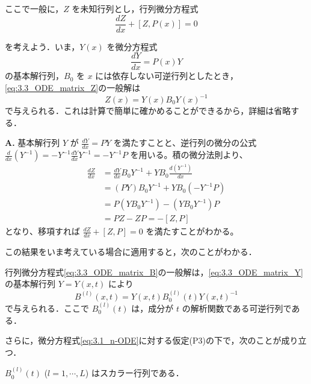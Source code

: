 ここで一般に，$Z$ を未知行列とし，行列微分方程式
\begin{equation}\label{eq:3.3_ODE_matrix_Z}
  \frac{dZ}{dx} + [Z, P(x)] = 0
\end{equation}

を考えよう．いま，$Y(x)$ を微分方程式
\begin{equation}\label{eq:3.3_ODE_matrix_Y}
  \frac{dY}{dx} = P(x)Y
\end{equation}
の基本解行列，$B_0$ を $x$ には依存しない可逆行列としたとき，\eqref{eq:3.3_ODE_matrix_Z}の一般解は
\[
  Z(x) = Y(x)B_0 Y(x)^{-1}
\]
で与えられる．これは計算で簡単に確かめることができるから，詳細は省略する．

\begin{Q}[「詳細は省略する」とあるが、一般解 $Z(x) = Y(x)B_0 Y(x)^{-1}$ が行列微分方程式 $\frac{dZ}{dx} + {[}Z, P{]} = 0$ を満たすことは、具体的にどう計算すれば確かめられるか？]
\textbf{A.} 基本解行列 $Y$ が $\frac{dY}{dx} = PY$ を満たすことと、逆行列の微分の公式 $\frac{d}{dx}(Y^{-1}) = -Y^{-1}\frac{dY}{dx}Y^{-1} = -Y^{-1}P$ を用いる。積の微分法則より、
\begin{align*}
  \frac{dZ}{dx} &= \frac{dY}{dx}B_0 Y^{-1} + Y B_0 \frac{d(Y^{-1})}{dx} \\[2mm]
  &= (PY)B_0 Y^{-1} + Y B_0 (-Y^{-1}P) \\[2mm]
  &= P(Y B_0 Y^{-1}) - (Y B_0 Y^{-1})P \\[2mm]
  &= PZ - ZP = -[Z, P]
\end{align*}
となり、移項すれば $\frac{dZ}{dx} + [Z, P] = 0$ を満たすことがわかる。
\end{Q}

この結果をいま考えている場合に適用すると，次のことがわかる．

\begin{lemma}\label{lem:3.3_solution_ODE}
行列微分方程式\eqref{eq:3.3_ODE_matrix_B}の一般解は，\eqref{eq:3.3_ODE_matrix_Y}の基本解行列 $Y=Y(x,t)$ により
\[
  B^{(l)}(x,t) = Y(x,t)B_0^{(l)}(t)Y(x,t)^{-1}
\]
で与えられる．ここで $B_0^{(l)}(t)$ は，成分が $t$ の解析関数である可逆行列である．
\end{lemma}

さらに，微分方程式\eqref{eq:3.1_n-ODE}に対する仮定(P3)の下で，次のことが成り立つ．

\begin{lemma}\label{lem:3.3_scalar_matrix_B}
$B_0^{(l)}(t)$ ($l=1,\cdots,L$) はスカラー行列である．
\end{lemma}

